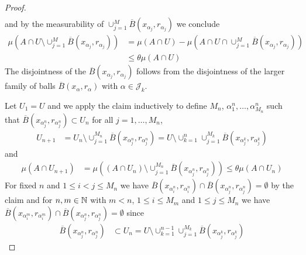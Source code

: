 \begin{proof}
\begin{align*}
\end{align*}
and by the measurability of $\cup_{j=1}^M \overline{B}(x_{\alpha_j}, r_{\alpha_j})$ we conclude
\begin{align*}
\mu \left( A \cap U \setminus \cup_{j=1}^M \overline{B}(x_{\alpha_j}, r_{\alpha_j})  \right)
&=\mu(A \cap U) - \mu \left( A \cap U \cap \cup_{j=1}^M \overline{B}(x_{\alpha_j}, r_{\alpha_j})  \right) \\
&\leq \theta \mu(A \cap U)
\end{align*}
The disjointness of the $\overline{B}(x_{\alpha_j}, r_{\alpha_j})$ follows from the disjointness of the larger family of balls $\overline{B}(x_{\alpha}, r_{\alpha})$ with $\alpha \in \mathcal{J}_k$.

Let $U_1 = U$ and we apply the claim inductively to define $M_n$, $\alpha^n_1, \dotsc, \alpha^n_{M_n}$ such that $\overline{B}(x_{\alpha^n_j}, r_{\alpha^n_j}) \subset U_n$ for all $j=1, \dotsc, M_n$,
\begin{align*}
U_{n+1} &= U_n \setminus \cup_{j=1}^{M_n} \overline{B}(x_{\alpha^n_j}, r_{\alpha^n_j}) = U \setminus \cup_{k=1}^n \cup_{j=1}^{M_k} \overline{B}(x_{\alpha^k_j}, r_{\alpha^k_j}) 
\end{align*}
and 
\begin{align*}
\mu(A \cap U_{n+1}) &= \mu \left( (A \cap U_n) \setminus \cup_{j=1}^{M_n} \overline{B}(x_{\alpha^n_j}, r_{\alpha^n_j}) \right) \leq \theta \mu(A \cap U_n)
\end{align*}
For fixed $n$ and $1 \leq i < j \leq M_n$ we have $\overline{B}(x_{\alpha^n_i}, r_{\alpha^n_i}) \cap \overline{B}(x_{\alpha^n_j}, r_{\alpha^n_j}) = \emptyset$ by the claim and for $n,m \in \mathbb{N}$ with $m < n$,
$1 \leq i \leq M_m$ and $1 \leq j \leq M_n$ we have $\overline{B}(x_{\alpha^m_i}, r_{\alpha^m_i}) \cap \overline{B}(x_{\alpha^n_j}, r_{\alpha^n_j}) = \emptyset$ since 
\begin{align*}
\overline{B}(x_{\alpha^n_j}, r_{\alpha^n_j}) &\subset U_n = U \setminus \cup_{k=1}^{n-1} \cup_{j=1}^{M_k} \overline{B}(x_{\alpha^k_j}, r_{\alpha^k_j})
\end{align*}


\end{proof}
